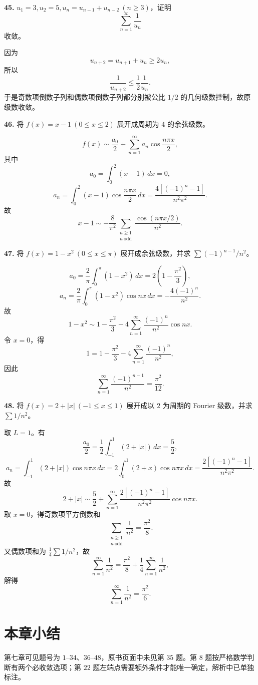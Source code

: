 \begin{problemblock}
\textbf{45.} \(u_1=3,u_2=5,u_n=u_{n-1}+u_{n-2}\ (n\ge3)\)，证明
\[
\sum_{n=1}^{\infty}\frac1{u_n}
\]
收敛。
\end{problemblock}
\begin{solutionblock}
因为
\[
u_{n+2}=u_{n+1}+u_n\ge2u_n,
\]
所以
\[
\frac1{u_{n+2}}\le\frac12\frac1{u_n}.
\]
于是奇数项倒数子列和偶数项倒数子列都分别被公比 \(1/2\) 的几何级数控制，故原级数收敛。
\end{solutionblock}

\begin{problemblock}
\textbf{46.} 将 \(f(x)=x-1\ (0\le x\le2)\) 展开成周期为 \(4\) 的余弦级数。
\end{problemblock}
\begin{solutionblock}
\[
f(x)\sim \frac{a_0}{2}+\sum_{n=1}^{\infty}a_n\cos\frac{n\pi x}{2},
\]
其中
\[
a_0=\int_0^2(x-1)\,dx=0,
\]
\[
a_n=\int_0^2(x-1)\cos\frac{n\pi x}{2}\,dx
=\frac{4[(-1)^n-1]}{n^2\pi^2}.
\]
故
\[
\boxed{
x-1\sim -\frac8{\pi^2}\sum_{\substack{n\ge1\\ n\ \mathrm{odd}}}
\frac{\cos(n\pi x/2)}{n^2}}.
\]
\end{solutionblock}

\begin{problemblock}
\textbf{47.} 将 \(f(x)=1-x^2\ (0\le x\le\pi)\) 展开成余弦级数，并求 \(\sum(-1)^{n-1}/n^2\)。
\end{problemblock}
\begin{solutionblock}
\[
a_0=\frac2\pi\int_0^\pi(1-x^2)\,dx=2\left(1-\frac{\pi^2}{3}\right),
\]
\[
a_n=\frac2\pi\int_0^\pi(1-x^2)\cos nx\,dx
=-\frac{4(-1)^n}{n^2}.
\]
故
\[
1-x^2\sim 1-\frac{\pi^2}{3}-4\sum_{n=1}^{\infty}\frac{(-1)^n}{n^2}\cos nx.
\]
令 \(x=0\)，得
\[
1=1-\frac{\pi^2}{3}-4\sum_{n=1}^{\infty}\frac{(-1)^n}{n^2},
\]
因此
\[
\boxed{\sum_{n=1}^{\infty}\frac{(-1)^{n-1}}{n^2}=\frac{\pi^2}{12}}.
\]
\end{solutionblock}

\begin{problemblock}
\textbf{48.} 将 \(f(x)=2+|x|\ (-1\le x\le1)\) 展开成以 \(2\) 为周期的 Fourier 级数，并求 \(\sum1/n^2\)。
\end{problemblock}
\begin{solutionblock}
取 \(L=1\)。有
\[
\frac{a_0}{2}=\frac12\int_{-1}^{1}(2+|x|)\,dx=\frac52,
\]
\[
a_n=\int_{-1}^{1}(2+|x|)\cos n\pi x\,dx
=2\int_0^1(2+x)\cos n\pi x\,dx
=\frac{2[(-1)^n-1]}{n^2\pi^2}.
\]
故
\[
2+|x|\sim \frac52+\sum_{n=1}^{\infty}
\frac{2[(-1)^n-1]}{n^2\pi^2}\cos n\pi x.
\]
取 \(x=0\)，得奇数项平方倒数和
\[
\sum_{\substack{n\ge1\\ n\ \mathrm{odd}}}\frac1{n^2}=\frac{\pi^2}{8}.
\]
又偶数项和为 \(\frac14\sum1/n^2\)，故
\[
\sum_{n=1}^{\infty}\frac1{n^2}
=\frac{\pi^2}{8}+\frac14\sum_{n=1}^{\infty}\frac1{n^2},
\]
解得
\[
\boxed{\sum_{n=1}^{\infty}\frac1{n^2}=\frac{\pi^2}{6}}.
\]
\end{solutionblock}

\section{本章小结}
第七章可见题号为 \(1\)--\(34\)、\(36\)--\(48\)，原书页面中未见第 \(35\) 题。第 \(8\) 题按严格数学判断有两个必收敛选项；第 \(22\) 题左端点需要额外条件才能唯一确定，解析中已单独标注。
